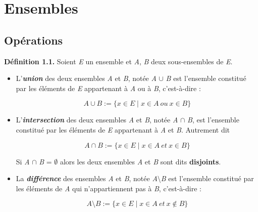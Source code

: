\documentclass{article}
\begin{document}

\section{Ensembles}
\subsection{Opérations}
\textbf{Définition 1.1.} Soient \textit{E} un ensemble et \textit{A}, \textit{B} deux sous-ensembles de \textit{E}.

\begin{itemize}

\item 

L'\textbf{\textit{union}} des deux ensembles \textit{A} et \textit{B}, notée \textit{A} $\cup$ \textit{B} est l’ensemble constitué par les éléments de \textit{E} appartenant à \textit{A} ou à \textit{B}, c’est-à-dire :

\newline
\newline

$$ \textit{A} \cup \textit{B} := \{ x \in \textit{E} \mid x \in \textit{A} \ ou \ x \in \textit{B}\} $$

\item 
L’\textbf{\textit{intersection}} des deux ensembles \textit{A} et \textit{B}, notée \textit{A} $\cap$ \textit{B}, est l’ensemble constitué par les éléments de \textit{E} appartenant à \textit{A} et \textit{B}.
Autrement dit

\newline
\newline

$$ \textit{A} \cap \textit{B} := \{ x \in \textit{E} \mid x \in \textit{A} \ et \ x \in \textit{B} \} $$

\newline
\newline

Si \textit{A} $\cap$ \textit{B} = $\emptyset$ alors les deux ensembles \textit{A} et \textit{B} sont dits \textbf{disjoints}.

\item La \textbf{\textit{différence}} des ensembles \textit{A} et \textit{B}, notée \textit{A}$\setminus$\textit{B} est l’ensemble constitué par les éléments de \textit{A} qui n’appartiennent pas à \textit{B}, c’est-à-dire :

\newline

$$ \textit{A} \setminus \textit{B} := \{ x \in \textit{E} \mid x \in \textit{A} \ et \ x \notin \textit{B} \} $$

\end{itemize}
\end{document}
